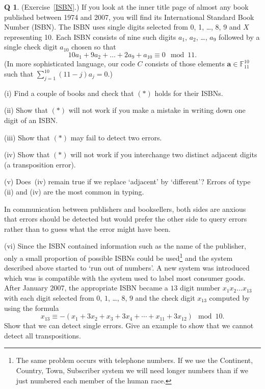 \documentclass[12pt,a4paper]{article}
\theoremstyle{plain}
\theoremstyle{definition}
\newtheorem{question}[theorem]{Q}
\begin{document}
    \begin{question}
        \label{C2.3} (Exercise~\ref{ISBN}.)
        If you look
        at the inner
        title page of almost any book
        published between 1974 and 2007,
        you will find its International Standard
        Book Number (ISBN). The ISBN
        uses single digits selected from 0, 1, \dots, 8, 9
        and $X$ representing 10. Each ISBN consists
        of nine such digits $a_{1}$, $a_{2}$, \dots, $a_{9}$
        followed by a single check digit $a_{10}$ chosen
        so that
        \begin{equation*}
            10a_{1}+9a_{2}+ \dots+2a_{9}+a_{10}\equiv 0\mod{11}.\tag*{(*)}
        \end{equation*}
        (In more sophisticated language, our code $C$ consists
        of those elements ${\mathbf a}\in {\mathbb F}_{11}^{10}$
        such that $\sum_{j=1}^{10}(11-j)a_{j}=0$.)


        (i) Find a couple of books
        and check that $(*)$ holds for their ISBNs.

        (ii) Show that $(*)$ will not work if you make a mistake
        in writing down one digit of an ISBN.

        (iii) Show that
        $(*)$ may fail to detect two errors.

        (iv)  Show that $(*)$ will not work if you interchange
        two distinct adjacent digits (a transposition error).

        (v) Does~(iv) remain true if we replace `adjacent'
        by `different'?
        \noindent Errors of type (ii) and (iv) are the most common
        in typing.

        In communication between publishers and booksellers,
        both sides are anxious that errors should be detected
        but would prefer the other side to query errors
        rather than to guess what the error might have been.

        (vi) Since the ISBN contained information such as the name of the
        publisher, only a small proportion of possible ISBNs could
        be used\footnote{The same problem occurs with telephone numbers.
        If we use the Continent, Country, Town, Subscriber system
        we will need longer numbers than if we just numbered
        each member of the human race.}
        and the system described above
        started to `run out of numbers'. A new system
        was introduced which was
        is compatible with the system used to label most consumer goods.
        After January 2007, the appropriate ISBN became a $13$ digit number
        $x_{1}x_{2}\dots x_{13}$ with each digit
        selected from $0$, $1$, \dots, $8$, $9$ and
        the check digit $x_{13}$ computed by using the formula
        \[x_{13}\equiv -(x_{1}+3x_{2}+x_{3}+3x_{4}+\cdots+x_{11}+ 3x_{12})
        \mod{10}.\]
        Show that we can detect single errors. Give an example
        to show that we cannot detect all transpositions.
    \end{question}
\end{document}
